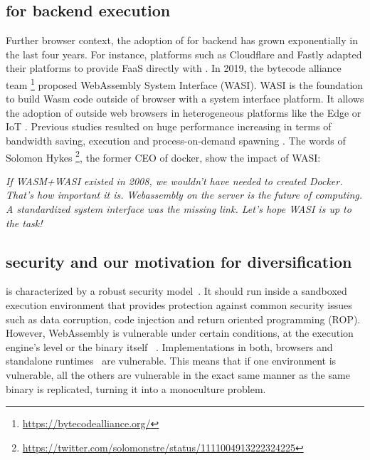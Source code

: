 \subsection*{\wasm for backend execution}

Further browser context, the adoption of \wasm for backend has grown exponentially in the last four years. For instance, platforms such as Cloudflare and Fastly adapted their platforms to provide FaaS directly with \wasm. In 2019, the bytecode alliance team \footnote{\url{https://bytecodealliance.org/}} proposed WebAssembly System Interface (WASI). WASI is the foundation to build Wasm code outside of browser with a system interface platform. It allows the adoption of \wasm outside web browsers \cite{bryant2020webassembly} in heterogeneous platforms like the Edge or IoT \cite{Narayan2021Swivel,Sledge}. Previous studies resulted on huge performance increasing in terms of bandwidth saving, execution and process-on-demand spawning \cite{9640153, wen2020wasmachine}.  The words of Solomon Hykes \footnote{\url{https://twitter.com/solomonstre/status/1111004913222324225}}, the former CEO of docker, show the impact of WASI: 
\begin{displayquote}
\textit{
    If WASM+WASI existed in 2008, we wouldn't have needed to created Docker. That's how important it is. Webassembly on the server is the future of computing. A standardized system interface was the missing link. Let's hope WASI is up to the task!
}
\end{displayquote}

\subsection*{\wasm security and our motivation for diversification}

\wasm is characterized by a robust security model~\cite{WebAssemblySecurity}. It should run inside a sandboxed execution environment that provides protection against common security issues such as data corruption, code injection and return oriented programming (ROP). However, WebAssembly is vulnerable under certain conditions, at the execution engine's level \cite{ChromeZero} or the binary itself ~\cite{usenixWasm2020}.
Implementations in both, browsers and standalone runtimes~\cite{Narayan2021Swivel} are vulnerable.
This means that if one environment is vulnerable, all the others are vulnerable in the exact same manner as the same \wasm binary is replicated, turning it into a monoculture problem.


